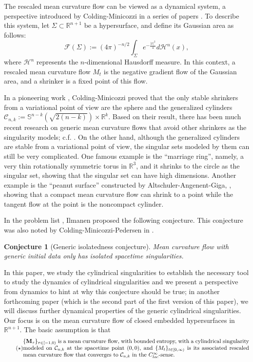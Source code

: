 \documentclass[11pt]{amsart}
\numberwithin{equation}{section}
\newtheorem{conjecture}[theorem]{Conjecture}
\numberwithin{equation}{section}
\newcommand{\bM}{\mathbf{M}}
\newcommand{\cH}{\mathcal{H}}
\newcommand{\cC}{\mathcal{C}}
\newcommand{\cF}{\mathcal{F}}
\newcommand{\R}{\mathbb{R}}
\begin{document}
	The rescaled mean curvature flow can be viewed as a dynamical system, a perspective introduced by Colding-Minicozzi in a series of papers \cite{CM1,CM2,ColdingMinicozzi19_Dynamics,CM7}. 
	To describe this system, let $\Sigma\subset\mathbb{R}^{n+1}$ be a hypersurface, and define its Gaussian area as follows:
	$$
	\cF(\Sigma):=(4\pi)^{-n/2}\int_{\Sigma}e^{-\frac{|x|^2}{4}}d\cH^n(x),
	$$ where $\cH^n$ represents the $n$-dimensional Hausdorff measure. In this context, a rescaled mean curvature flow $M_t$ is the negative gradient flow of the Gaussian area, and a shrinker is a fixed point of this flow. 
	
	In a pioneering work \cite{CM1}, Colding-Minicozzi proved that the only stable shrinkers from a variational point of view are the sphere and the generalized cylinders $\cC_{n,k}:=\mathbb{S}^{n-k}(\sqrt{2(n-k)})\times\R^k$. Based on their result, there has been much recent research on generic mean curvature flows that avoid other shrinkers as the singularity models; c.f. \cite{ColdingMinicozzi19_Dynamics, SX1, SX2, CCMS, CCS, BamlerKleiner23_multiplicity}. On the other hand, although the generalized cylinders are stable from a variational point of view, the singular sets modeled by them can still be very complicated. One famous example is the ``marriage ring'', namely, a very thin rotationally symmetric torus in $\R^3$, and it shrinks to the circle as the singular set, showing that the singular set can have high dimensions. Another example is the ``peanut surface'' constructed by Altschuler-Angenent-Giga, \cite{AAG}, showing that a compact mean curvature flow can shrink to a point while the tangent flow at the point is the noncompact cylinder.
	
	In the problem list \cite{I1}, Ilmanen proposed the following conjecture. This conjecture was also noted by Colding-Minicozzi-Pedersen in \cite[Conjecture 7.1]{CMP}.
	
	\begin{conjecture}[Generic isolatedness conjecture]\label{ConIsolate}
		Mean curvature flow with generic initial data only has isolated spacetime singularities. 
	\end{conjecture}
	
	
	In this paper, we study the cylindrical singularities to establish the necessary tool to study the dynamics of cylindrical singularities and we present a perspective from dynamics to hint at why this conjecture should be true; in another forthcoming paper (which is the second part of the first version of this paper), we will discuss further dynamical properties of the generic cylindrical singularities. Our focus is on the mean curvature flow of closed embedded hypersurfaces in $\R^{n+1}$. The basic assumption is that 
	\begin{equation}\label{eq:StarCondition}\tag{$\star$}
		\parbox{5.5in}{%
			\emph{$\{\bM_\tau\}_{\tau\in[-1,0)}$ is a mean curvature flow, with bounded entropy, with a cylindrical singularity modeled on $\cC_{n,k}$ at the spacetime point $(0,0)$, and $\{M_t\}_{t\in [0,\infty)}$ is its associated rescaled mean curvature flow that converges to $\cC_{n,k}$ in the $C^\infty_{loc}$-sense.}%
		}
	\end{equation}
	
\end{document}
